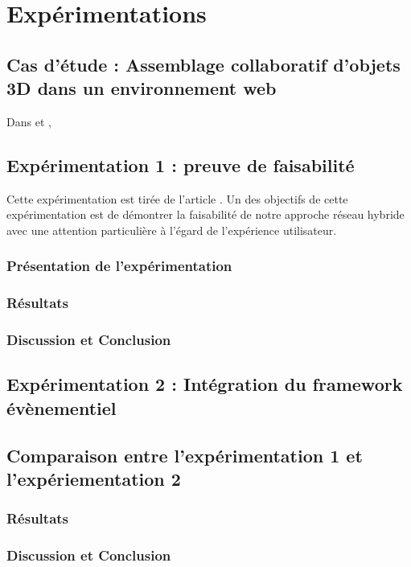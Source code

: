 \chapter{Expérimentations}
\chaptertable
\section{Cas d'étude : Assemblage collaboratif d'objets 3D dans un 
environnement web}
Dans \cite{Desprat2015a} et \cite{Desprat2017}, 


\section{Expérimentation 1 : preuve de faisabilité}
Cette expérimentation est tirée de l'article \cite{Desprat2015a}.
Un des objectifs de cette expérimentation est de démontrer la faisabilité de notre 
approche réseau hybride avec une attention particulière à l'égard de l'expérience 
utilisateur.
\subsection{Présentation de l'expérimentation}

\subsection{Résultats}
\subsection{Discussion et Conclusion}

\section{Expérimentation 2 : Intégration du framework évènementiel}
\label{sec:us}






\section{Comparaison entre l'expérimentation 1 et l'expériementation 2}
\subsection{Résultats}
\subsection{Discussion et Conclusion}
